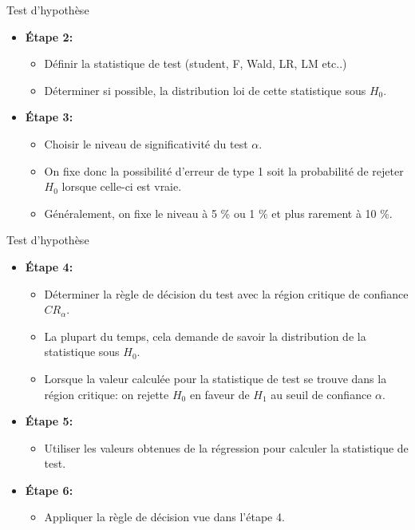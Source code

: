 \documentclass{beamer}
\begin{document}
\begin{frame}{Test d'hypothèse}

\begin{itemize}
\item \textbf{Étape 2:} 
\begin{itemize}
\item Définir la statistique de test (student, F, Wald, LR, LM etc..) 
\item Déterminer si possible, la distribution loi de cette statistique sous $H_0$.
\end{itemize}
\item \textbf{Étape 3:}
\begin{itemize}
\item Choisir le niveau de significativité du test $\alpha$.
\item On fixe donc la possibilité d’erreur de type 1 soit la probabilité de rejeter $H_0$ lorsque celle-ci est vraie.
\item Généralement, on fixe le niveau à 5 \% ou 1 \% et plus rarement à 10 \%.

\end{itemize}
\end{itemize}
\end{frame}


\begin{frame}{Test d'hypothèse}

\begin{itemize}
\item \textbf{Étape 4:} 
\begin{itemize}
\item Déterminer la règle de décision du test avec la région critique de confiance $CR_{\alpha}$.
\item La plupart du temps, cela demande de savoir la distribution de la statistique sous $H_0$.
\item Lorsque la valeur calculée pour la statistique de test se trouve dans la région critique: on rejette $H_0$ en faveur de $H_1$ au seuil de confiance $\alpha$.
\end{itemize}
\item \textbf{Étape 5:}
\begin{itemize}
\item Utiliser les valeurs obtenues de la régression pour calculer la statistique de test.
\end{itemize}
\item \textbf{Étape 6:}
\begin{itemize}
\item Appliquer la règle de décision vue dans l'étape 4.
\end{itemize}
\end{itemize}
\end{frame}
\end{document}
